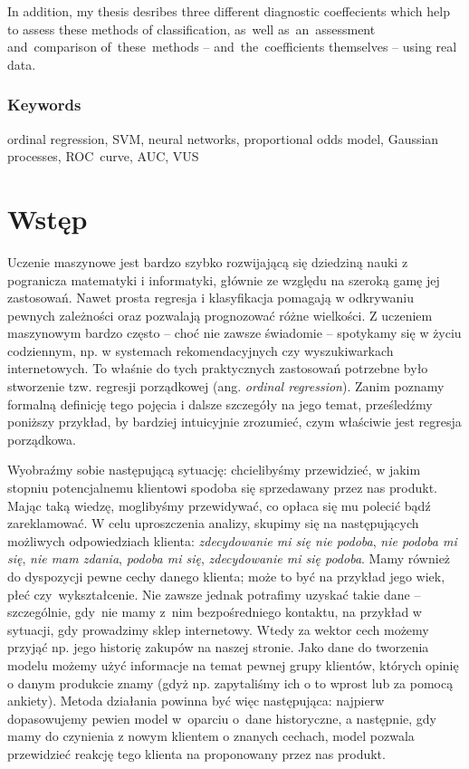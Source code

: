 \documentclass{mini}
\begin{document}
In addition, my thesis desribes three different diagnostic coeffecients which help to assess these methods of classification, as~well as~an~assessment and~comparison of~these~methods -- and~the~coefficients themselves -- using real data.

\subsection*{Keywords}

ordinal regression, SVM, neural networks, proportional odds model, Gaussian processes, ROC~curve, AUC, VUS

\chapter*{Wstęp}

Uczenie maszynowe jest bardzo szybko rozwijającą się dziedziną nauki z pogranicza matematyki i informatyki, głównie ze względu na szeroką gamę jej zastosowań. Nawet prosta regresja i klasyfikacja pomagają w odkrywaniu pewnych zależności oraz pozwalają prognozować różne wielkości. Z uczeniem maszynowym bardzo często -- choć nie zawsze świadomie -- spotykamy się w życiu codziennym, np. w systemach rekomendacyjnych czy wyszukiwarkach internetowych. To właśnie do tych praktycznych zastosowań potrzebne było stworzenie tzw. regresji porządkowej (ang. \textit{ordinal regression}). Zanim poznamy formalną definicję tego pojęcia i dalsze szczegóły na jego temat, prześledźmy poniższy przykład, by bardziej intuicyjnie zrozumieć, czym właściwie jest regresja porządkowa.  

Wyobraźmy sobie następującą sytuację: chcielibyśmy przewidzieć, w jakim stopniu potencjalnemu klientowi spodoba się sprzedawany przez nas produkt. Mając taką wiedzę, moglibyśmy przewidywać, co opłaca się mu polecić bądź zareklamować. W celu uproszczenia analizy, skupimy się na następujących możliwych odpowiedziach klienta: \textit{zdecydowanie mi się nie podoba}, \textit{nie podoba mi się}, \textit{nie mam zdania}, \textit{podoba mi się}, \textit{zdecydowanie mi się podoba}. Mamy również do dyspozycji pewne cechy danego klienta; może to być na przykład jego wiek, płeć czy~wykształcenie. Nie zawsze jednak potrafimy uzyskać takie dane -- szczególnie, gdy~nie mamy z~nim bezpośredniego kontaktu, na przykład w sytuacji, gdy prowadzimy sklep internetowy. Wtedy za wektor cech możemy przyjąć np. jego historię zakupów na naszej stronie. Jako dane do tworzenia modelu możemy użyć informacje na temat pewnej grupy klientów, których opinię o danym produkcie znamy (gdyż np. zapytaliśmy ich o to wprost lub za pomocą ankiety). Metoda działania powinna być więc następująca: najpierw dopasowujemy pewien model w~oparciu o~dane historyczne, a następnie, gdy mamy do czynienia z nowym klientem o znanych cechach, model pozwala przewidzieć reakcję tego klienta na proponowany przez nas produkt. 
\end{document}
